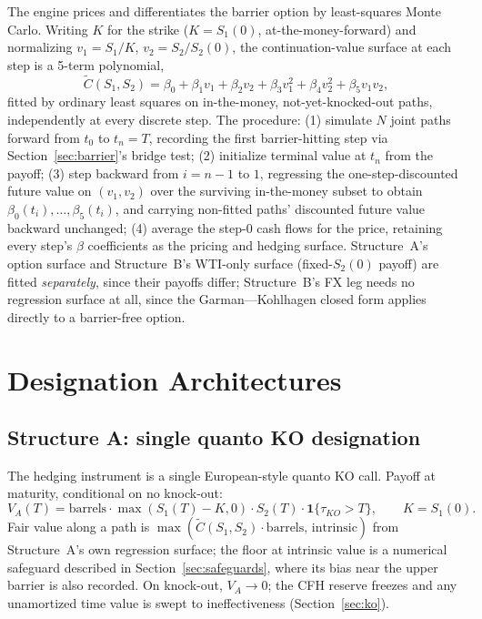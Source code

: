 \documentclass[11pt,a4paper]{article}
\begin{document}
The engine prices and differentiates the barrier option by least-squares Monte Carlo. Writing $K$ for the strike ($K=S_1(0)$, at-the-money-forward) and normalizing $v_1=S_1/K$, $v_2=S_2/S_2(0)$, the continuation-value surface at each step is a 5-term polynomial,
\begin{equation}
\tilde C(S_1,S_2) = \beta_0+\beta_1v_1+\beta_2v_2+\beta_3v_1^2+\beta_4v_2^2+\beta_5v_1v_2,
\end{equation}
fitted by ordinary least squares on in-the-money, not-yet-knocked-out paths, independently at every discrete step. The procedure: (1) simulate $N$ joint paths forward from $t_0$ to $t_n=T$, recording the first barrier-hitting step via Section~\ref{sec:barrier}'s bridge test; (2) initialize terminal value at $t_n$ from the payoff; (3) step backward from $i=n-1$ to $1$, regressing the one-step-discounted future value on $(v_1,v_2)$ over the surviving in-the-money subset to obtain $\beta_0(t_i),\ldots,\beta_5(t_i)$, and carrying non-fitted paths' discounted future value backward unchanged; (4) average the step-0 cash flows for the price, retaining every step's $\beta$ coefficients as the pricing and hedging surface. Structure~A's option surface and Structure~B's WTI-only surface (fixed-$S_2(0)$ payoff) are fitted \emph{separately}, since their payoffs differ; Structure~B's FX leg needs no regression surface at all, since the Garman---Kohlhagen closed form applies directly to a barrier-free option.

\section{Designation Architectures}
\label{sec:arch}

\subsection{Structure A: single quanto KO designation}
\label{sec:structA}

The hedging instrument is a single European-style quanto KO call. Payoff at maturity, conditional on no knock-out:
\begin{equation}
V_A(T) = \mathrm{barrels}\cdot\max(S_1(T)-K,0)\cdot S_2(T)\cdot\mathbf 1\{\tau_{KO}>T\}, \qquad K=S_1(0).
\end{equation}
Fair value along a path is $\max(\tilde C(S_1,S_2)\cdot\mathrm{barrels},\,\mathrm{intrinsic})$ from Structure~A's own regression surface; the floor at intrinsic value is a numerical safeguard described in Section~\ref{sec:safeguards}, where its bias near the upper barrier is also recorded. On knock-out, $V_A\to 0$; the CFH reserve freezes and any unamortized time value is swept to ineffectiveness (Section~\ref{sec:ko}).
\end{document}
